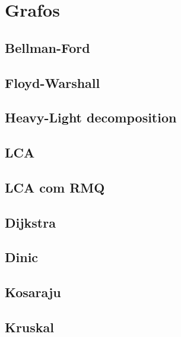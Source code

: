 \documentclass[12pt]{article}
\begin{document}
%
%

\section{Grafos}

\subsection{Bellman-Ford}


\subsection{Floyd-Warshall}


\subsection{Heavy-Light decomposition}


\subsection{LCA}


\subsection{LCA com RMQ}


\subsection{Dijkstra}


\subsection{Dinic}


\subsection{Kosaraju}


\subsection{Kruskal}

\end{document}
